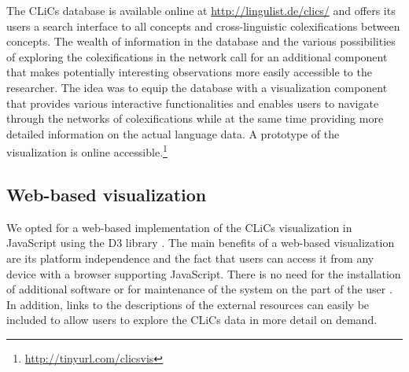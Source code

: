 The CLiCs database is available online at \url{http://lingulist.de/clics/} and offers its users a search interface to all concepts and cross-linguistic colexifications between concepts. The wealth of information in the database and the various possibilities of exploring the colexifications in the network call for an additional component that makes potentially interesting observations more easily accessible to the researcher. The idea was to equip the database with a visualization component that provides various interactive functionalities and enables users to navigate through the networks of colexifications while at the same time providing more detailed information on the actual language data. A prototype of the visualization is online accessible.\footnote{\url{http://tinyurl.com/clicsvis}}

\subsection{Web-based visualization}

We opted for a web-based implementation of the CLiCs visualization in JavaScript using the D3 library \cite{D3}. The main benefits of a web-based visualization are its platform independence and the fact that users can access it from any device with a browser supporting JavaScript. There is no need for the installation of additional software or for maintenance of the system on the part of the user \cite{Murray}. In addition, links to the descriptions of the external resources can easily be included to allow users to explore the CLiCs data in more detail on demand. 

